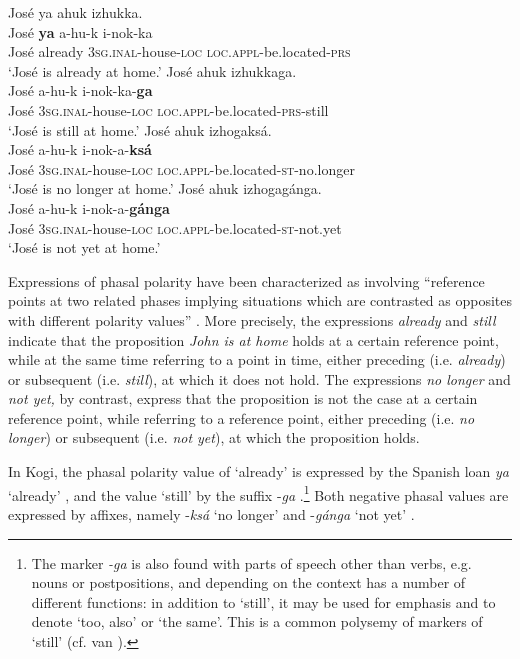 \documentclass[output=paper,colorlinks,citecolor=brown]{langscibook}
\begin{document}
\ea\label{ex:kog:22}
    \ea\label{ex:kog:22a} José ya ahuk izhukka.\\
        \gll  José \textbf{ya} a-hu-k i-nok-ka\\ 
              José already \textsc{3sg.inal{}-}house-\textsc{loc} \textsc{loc.appl{}-}be.located-\textsc{prs}\\
        \glt ‘José is already at home.’
    \ex\label{ex:kog:22b}José ahuk izhukkaga.\\
        \gll  José a-hu-k i-nok-ka{}-\textbf{ga}\\
              José \textsc{3sg.inal{}-}house-\textsc{loc} \textsc{loc.appl{}-}be.located-\textsc{prs{}-}still\\
        \glt  ‘José is still at home.’
     \ex\label{ex:kog:22c}José ahuk izhogaksá.\\
        \gll  José a-hu-k i-nok{}-a-\textbf{ksá}\\
              José \textsc{3sg.inal{}-}house-\textsc{loc} \textsc{loc.appl{}-}be.located\textsc{{}-st{}-}no.longer\\
        \glt ‘José is no longer at home.’
    \ex\label{ex:kog:22d}José ahuk izhogag\'{a}nga.\\
        \gll  José a-hu{}-k i-nok{}-a{}-\textbf{g\'{a}nga}\\
              José \textsc{3sg.inal{}-}house-\textsc{loc} \textsc{loc.appl{}-}be.located\textsc{{}-st{}-}not.yet\\
        \glt ‘José is not yet at home.’
    \z
\z 

Expressions of phasal polarity have been characterized as involving “reference points at two related phases implying situations which are contrasted as opposites with different polarity values” \citep[1]{Kramer2017}. More precisely, the expressions \textit{already} and \textit{still} indicate that the proposition \textit{John is at home} holds at a certain reference point, while at the same time referring to a point in time, either preceding (i.e. \textit{already}) or subsequent (i.e. \textit{still}), at which it does not hold. The expressions \textit{no longer} and \textit{not yet,} by contrast, express that the proposition is not the case at a certain reference point, while referring to a reference point, either preceding (i.e. \textit{no longer}) or subsequent (i.e. \textit{not yet}), at which the proposition holds.

In Kogi, the phasal polarity value of ‘already’ is expressed by the Spanish loan \textit{ya} ‘already’ , and the value ‘still’ by the suffix -\textit{ga} .\footnote{The marker \textit{{}-ga} is also found with parts of speech other than verbs, e.g. nouns or postpositions, and depending on the context has a number of different functions: in addition to ‘still’, it may be used for emphasis and to denote ‘too, also’ or ‘the same’. This is a common polysemy of markers of ‘still’ (cf. van \citealt{Baar1997}).} Both negative phasal values are expressed by affixes, namely {}-\textit{ksá} ‘no longer’  and \nobreakdash-\textit{gánga} ‘not yet’ .
\end{document}
